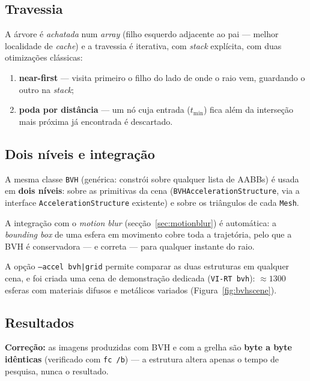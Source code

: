 \documentclass[11pt,a4paper]{article}
\begin{document}
\subsection{Travessia}

A árvore é \emph{achatada} num \emph{array} (filho esquerdo adjacente ao pai --- melhor localidade de \emph{cache}) e a travessia é iterativa, com \emph{stack} explícita, com duas otimizações clássicas:

\begin{enumerate}
  \item \textbf{near-first} --- visita primeiro o filho do lado de onde o raio vem, guardando o outro na \emph{stack};
  \item \textbf{poda por distância} --- um nó cuja entrada ($t_{\min}$) fica além da interseção mais próxima já encontrada é descartado.
\end{enumerate}

\subsection{Dois níveis e integração}
\label{sec:bvh-integracao}

A mesma classe \texttt{BVH} (genérica: constrói sobre qualquer lista de AABBs) é usada em \textbf{dois níveis}: sobre as primitivas da cena (\texttt{BVHAccelerationStructure}, via a interface \texttt{AccelerationStructure} existente) e sobre os triângulos de cada \texttt{Mesh}.

A integração com o \emph{motion blur} (secção~\ref{sec:motionblur}) é automática: a \emph{bounding box} de uma esfera em movimento cobre toda a trajetória, pelo que a BVH é conservadora --- e correta --- para qualquer instante do raio.

A opção \texttt{--accel bvh|grid} permite comparar as duas estruturas em qualquer cena, e foi criada uma cena de demonstração dedicada (\texttt{VI-RT bvh}): ${\approx}1300$ esferas com materiais difusos e metálicos variados (Figura~\ref{fig:bvhscene}).

\subsection{Resultados}

\textbf{Correção:} as imagens produzidas com BVH e com a grelha são \textbf{byte a byte idênticas} (verificado com \texttt{fc /b}) --- a estrutura altera apenas o tempo de pesquisa, nunca o resultado.
\end{document}
